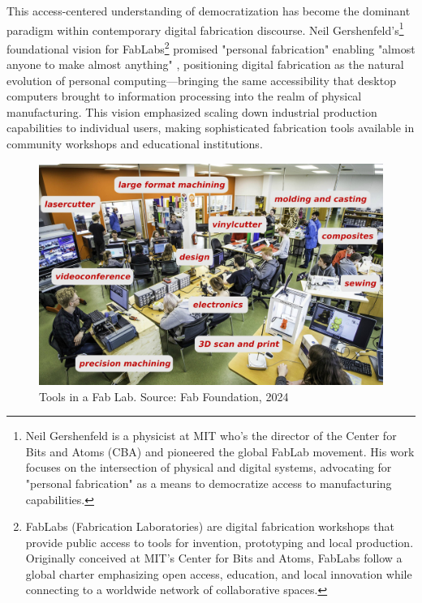 This access-centered understanding of democratization has become the dominant paradigm within contemporary digital fabrication discourse. Neil Gershenfeld's\footnote{Neil Gershenfeld is a physicist at MIT who's the director of the Center for Bits and Atoms (CBA) and pioneered the global FabLab movement. His work focuses on the intersection of physical and digital systems, advocating for "personal fabrication" as a means to democratize access to manufacturing capabilities.} foundational vision for FabLabs\footnote{FabLabs (Fabrication Laboratories) are digital fabrication workshops that provide public access to tools for invention, prototyping and local production. Originally conceived at MIT's Center for Bits and Atoms, FabLabs follow a global charter emphasizing open access, education, and local innovation while connecting to a worldwide network of collaborative spaces.} promised "personal fabrication" enabling "almost anyone to make almost anything" \citep{gershenfeld2007}, positioning digital fabrication as the natural evolution of personal computing—bringing the same accessibility that desktop computers brought to information processing into the realm of physical manufacturing. This vision emphasized scaling down industrial production capabilities to individual users, making sophisticated fabrication tools available in community workshops and educational institutions.

\vspace{0.5cm}

\begin{figure}[h]
\centering
\includegraphics[width=1\textwidth]{figures/chapter2/fablab_tools.jpg}
\caption{Tools in a Fab Lab. Source: Fab Foundation, 2024}
\label{fig:fablab_tools}
\end{figure}

